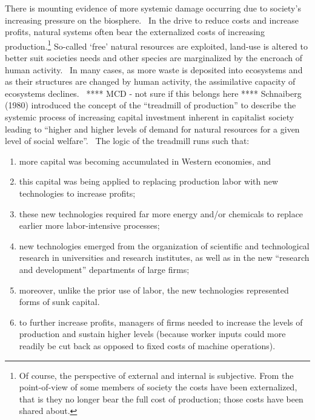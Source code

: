 There is mounting evidence of more systemic
damage occurring due to society's increasing pressure on
the biosphere.~\cite{MEA2005,Ewing2008}
In the drive to reduce costs and increase profits,
natural systems often bear the externalized costs
of increasing production.\footnote{Of course,
												the perspective of external and internal is subjective.
												From the point-of-view of some members of society
												the costs have been externalized, 
												that is they no longer bear the full cost of production;
												those costs have been shared about.
												}
So-called `free' natural resources are exploited,
land-use is altered to better suit societies needs
and other species are marginalized by the encroach of human activity.~\cite{Schnaiberg1980}
In many cases, as more waste is deposited into ecosystems
and as their structures are changed by human activity,
the assimilative capacity of ecosystems declines.~\cite{UNMEA2005}
**** MCD - not sure if this belongs here ****
Schnaiberg (1980) introduced the concept of 
the ``treadmill of production'' to describe the systemic process of
increasing capital investment inherent in capitalist society
leading to ``higher and higher levels of demand for natural resources 
for a given level of social welfare''.~\cite[p.297]{Gould2004}
The logic of the treadmill runs such that:
\begin{enumerate}
	\item more capital was becoming accumulated in Western economies, and 
	\item this capital was being applied to replacing production labor 
				with new technologies to increase profits; 
	\item these new technologies required far more energy and/or chemicals 
				to replace earlier more labor-intensive processes;
	\item new technologies emerged from the organization of scientific and 
				technological research in universities and research institutes, 
				as well as in the new ``research and development'' departments of large firms;
	\item moreover, unlike the prior use of labor, the new technologies represented forms of sunk capital. 
	\item to further increase profits, managers of firms needed to increase the levels of production 
				and sustain higher levels (because worker inputs could more readily be cut back 
				as opposed to fixed costs of machine operations).~\cite[p.296]{Gould2004}
\end{enumerate}

